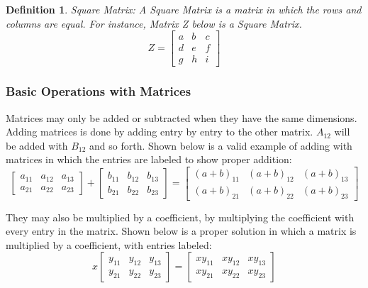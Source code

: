 \documentclass[final,1p,12pt]{elsarticle}
\newtheorem{definition}{Definition}
\begin{document}
        \begin{definition}Square Matrix:
        A Square Matrix is a matrix in which the rows and columns are equal. For instance, Matrix Z below is a Square Matrix.
        \begin{equation}%
            Z =
            \begin{bmatrix}
                a & b & c\\
                d & e & f\\
                g & h & i
            \end{bmatrix}
        \end{equation}
        \end{definition}
        
        \subsubsection{Basic Operations with Matrices}
        Matrices may only be added or subtracted when they have the same dimensions. Adding matrices is done by adding entry by entry to the other matrix. $A_{12}$ will be added with $B_{12}$ and so forth. Shown below is a valid example of adding with matrices in which the entries are labeled to show proper addition:
        \begin{equation}
            \begin{bmatrix}
                a_{11} & a_{12} & a_{13} \\
                a_{21} & a_{22} & a_{23}
            \end{bmatrix}
            +
            \begin{bmatrix}
                b_{11} & b_{12} & b_{13} \\
                b_{21} & b_{22} & b_{23}
            \end{bmatrix}
            =
            \begin{bmatrix}
                (a+b)_{11} & (a+b)_{12} & (a+b)_{13} \\
                (a+b)_{21} & (a+b)_{22} & (a+b)_{23}
            \end{bmatrix}
        \end{equation}
        
        They may also be multiplied by a coefficient, by multiplying the coefficient with every entry in the matrix. Shown below is a proper solution in which a matrix is multiplied by a coefficient, with entries labeled:
         \begin{equation}
         x
            \begin{bmatrix}
                y_{11} & y_{12} & y_{13} \\
                y_{21} & y_{22} & y_{23}
            \end{bmatrix}
        =
            \begin{bmatrix}
                xy_{11} & xy_{12} & xy_{13} \\
                xy_{21} & xy_{22} & xy_{23}
            \end{bmatrix}
        \end{equation}
        
\end{document}
